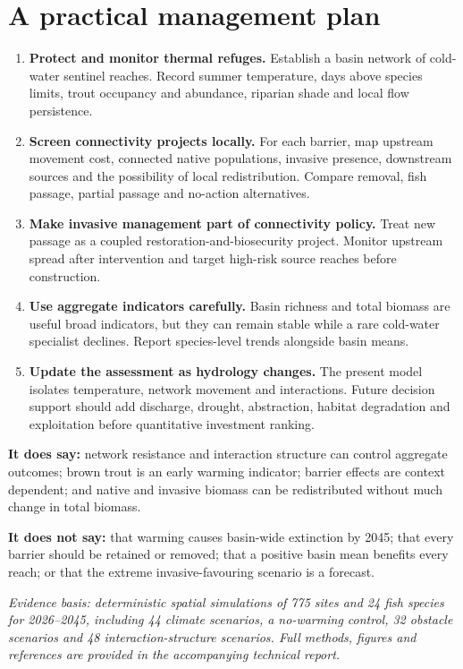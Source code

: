 \documentclass[10pt,a4paper]{article}
\begin{document}
\clearpage
\section*{A practical management plan}

\begin{enumerate}
\item \textbf{Protect and monitor thermal refuges.} Establish a basin network of cold-water sentinel reaches. Record summer temperature, days above species limits, trout occupancy and abundance, riparian shade and local flow persistence.
\item \textbf{Screen connectivity projects locally.} For each barrier, map upstream movement cost, connected native populations, invasive presence, downstream sources and the possibility of local redistribution. Compare removal, fish passage, partial passage and no-action alternatives.
\item \textbf{Make invasive management part of connectivity policy.} Treat new passage as a coupled restoration-and-biosecurity project. Monitor upstream spread after intervention and target high-risk source reaches before construction.
\item \textbf{Use aggregate indicators carefully.} Basin richness and total biomass are useful broad indicators, but they can remain stable while a rare cold-water specialist declines. Report species-level trends alongside basin means.
\item \textbf{Update the assessment as hydrology changes.} The present model isolates temperature, network movement and interactions. Future decision support should add discharge, drought, abstraction, habitat degradation and exploitation before quantitative investment ranking.
\end{enumerate}

\begin{tcolorbox}[colback=waterlight,colframe=riverblue!70!black,title=\textbf{What this evidence does and does not say},fonttitle=\bfseries]
\textbf{It does say:} network resistance and interaction structure can control aggregate outcomes; brown trout is an early warming indicator; barrier effects are context dependent; and native and invasive biomass can be redistributed without much change in total biomass.

\textbf{It does not say:} that warming causes basin-wide extinction by 2045; that every barrier should be retained or removed; that a positive basin mean benefits every reach; or that the extreme invasive-favouring scenario is a forecast.
\end{tcolorbox}

\vfill
\begin{center}
\footnotesize
\textit{Evidence basis: deterministic spatial simulations of 775 sites and 24 fish species for 2026--2045, including 44 climate scenarios, a no-warming control, 32 obstacle scenarios and 48 interaction-structure scenarios. Full methods, figures and references are provided in the accompanying technical report.}
\end{center}
\end{document}
